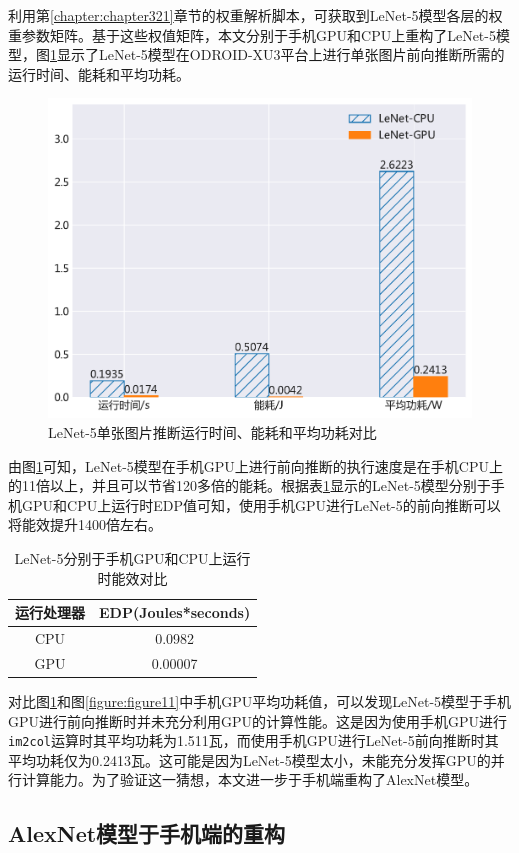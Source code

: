 利用第\ref{chapter:chapter321}章节的权重解析脚本，可获取到LeNet-5模型各层的权重参数矩阵。基于这些权值矩阵，本文分别于手机GPU和CPU上重构了LeNet-5模型，图\ref{figure:figure16}显示了LeNet-5模型在ODROID-XU3平台上进行单张图片前向推断所需的运行时间、能耗和平均功耗。

\begin{figure}[htbp]
    \centering
    \includegraphics[height=0.4\textwidth]{figures/lenet_energy.pdf}
    \caption{LeNet-5单张图片推断运行时间、能耗和平均功耗对比}\label{figure:figure16}
\end{figure}

由图\ref{figure:figure16}可知，LeNet-5模型在手机GPU上进行前向推断的执行速度是在手机CPU上的11倍以上，并且可以节省120多倍的能耗。根据表\ref{table:table6}显示的LeNet-5模型分别于手机GPU和CPU上运行时EDP值可知，使用手机GPU进行LeNet-5的前向推断可以将能效提升1400倍左右。

\begin{table}[htbp]
  \centering
  \caption{LeNet-5分别于手机GPU和CPU上运行时能效对比}
  \label{table:table6}
  \begin{tabular}{cc}
    \toprule
      运行处理器 & EDP(Joules*seconds) \\
    \midrule
      CPU & 0.0982 \\
      GPU & 0.00007 \\
    \bottomrule
  \end{tabular}
\end{table}

对比图\ref{figure:figure16}和图\ref{figure:figure11}中手机GPU平均功耗值，可以发现LeNet-5模型于手机GPU进行前向推断时并未充分利用GPU的计算性能。这是因为使用手机GPU进行\texttt{im2col}运算时其平均功耗为1.511瓦，而使用手机GPU进行LeNet-5前向推断时其平均功耗仅为0.2413瓦。这可能是因为LeNet-5模型太小，未能充分发挥GPU的并行计算能力。为了验证这一猜想，本文进一步于手机端重构了AlexNet模型。

\subsection{AlexNet模型于手机端的重构}

